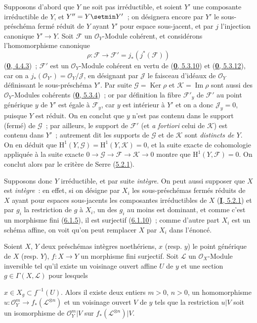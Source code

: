 Supposons d'abord que $Y$ ne soit pas irréductible, et soient $Y'$ une
composante irréductible de $Y$, et $Y''=Y\setmin Y'$~; on désignera encore par
$Y'$ le sous-préschéma fermé réduit de $Y$ ayant $Y'$ pour espace
sous-jacent, et par $j$ l'injection canonique $Y'\to Y$. Soit $\mathcal{F}$
un $\mathcal{O}_Y$-Module cohérent, et considérons l'homomorphisme canonique
\[
\rho:\mathcal{F}\longrightarrow
\mathcal{F}'=j_*(j^*(\mathcal{F}))
\]
(\hyperref[0.4.4.3-fr]{\textbf{0}, 4.4.3})~; $\mathcal{F}'$ est un
$\mathcal{O}_Y$-Module cohérent en vertu de
(\hyperref[0.5.3.10-fr]{\textbf{0}, 5.3.10}) et
(\hyperref[0.5.3.12-fr]{\textbf{0}, 5.3.12}), car on a
$j_*(\mathcal{O}_{Y'})=\mathcal{O}_Y/\mathcal{J}$, en désignant par
$\mathcal{J}$ le faisceau d'idéaux de $\mathcal{O}_Y$ définissant le
sous-préschéma $Y'$. Par suite $\mathcal{G}=\operatorname{Ker}\rho$ et
$\mathcal{K}=\operatorname{Im}\rho$ sont aussi des $\mathcal{O}_Y$-Modules
cohérents (\hyperref[0.5.3.4-fr]{\textbf{0}, 5.3.4})~; or par définition la fibre
$\mathcal{F}'_y$ de $\mathcal{F}'$ au point générique $y$ de $Y'$ est égale
à $\mathcal{F}_y$, car $y$ est intérieur à $Y'$ et on a donc
$\mathcal{J}_y=0$, puisque $Y$ est réduit. On en conclut que $y$ n'est pas
contenu dans le support (fermé) de $\mathcal{G}$~; par ailleurs, le support de
$\mathcal{F}'$ (et \emph{a fortiori} celui de $\mathcal{K}$) est contenu
dans $Y'$~; autrement dit les supports de $\mathcal{G}$ et de $\mathcal{K}$
sont \emph{distincts de $Y$}. On en déduit que
$\mathrm{H}^1(Y,\mathcal{G})=\mathrm{H}^1(Y,\mathcal{K})=0$, et la suite
exacte de cohomologie appliquée à la suite exacte
$0\to\mathcal{G}\to\mathcal{F}\to\mathcal{K}\to0$ montre que
$\mathrm{H}^1(Y,\mathcal{F})=0$. On conclut alors par le critère de Serre
(\hyperref[II.5.2.1-fr]{5.2.1}).

Supposons donc $Y$ irréductible, et par suite \emph{intègre}. On peut aussi
supposer que $X$ est \emph{intègre}~: en effet, si on désigne par $X_i$ les
sous-préschémas fermés réduits de $X$ ayant pour espaces sous-jacents les
composantes irréductibles de $X$ (\hyperref[I.5.2.1-fr]{\textbf{I}, 5.2.1}) et par
$g_i$ la restriction de $g$ à $X_i$, un des $g_i$ au moins est dominant, et
comme c'est un morphisme fini (\hyperref[II.6.1.5-fr]{6.1.5}), il est
surjectif (\hyperref[II.6.1.10-fr]{6.1.10})~; comme d'autre part $X_i$ est un
schéma affine, on voit qu'on peut remplacer $X$ par $X_i$ dans l'énoncé.

\begin{lemma}[6.7.1.1]
\label{II.6.7.1.1-fr}
Soient $X$, $Y$ deux préschémas intègres noethériens, $x$ \textup{(resp. $y$)} le
point générique de $X$ \textup{(resp. $Y$)}, $f:X\to Y$ un morphisme fini surjectif.
Soit $\mathcal{L}$ un $\mathcal{O}_X$-Module inversible tel qu'il existe un
voisinage ouvert affine $U$ de $y$ et une section
$g\in\Gamma(X,\mathcal{L})$ pour lesquels


$x\in X_g\subset f^{-1}(U)$. Alors il existe deux entiers $m>0$, $n>0$, un
homomorphisme
$u:\mathcal{O}_Y^m\to f_*(\mathcal{L}^{\otimes n})$ et un voisinage ouvert
$V$ de $y$ tels que la restriction $u|V$ soit un isomorphisme de
$\mathcal{O}_Y^m|V$ sur $f_*(\mathcal{L}^{\otimes n})|V$.
\end{lemma}

